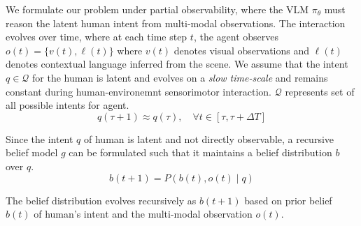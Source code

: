 \documentclass[letterpaper, 10 pt, conference]{ieeeconf}  %
\begin{document}
We formulate our problem under partial observability, where the   VLM $\pi_{\theta}$ must reason the latent human intent  from multi-modal observations. The interaction evolves over time, where at each time step $t$, the agent observes
$o(t) = \{v(t), \ell(t)\}$
where $v(t)$ denotes visual observations and $\ell(t)$ denotes contextual language inferred from the scene. 
We assume that the intent $q \in \mathcal{Q}$ for the human is latent and evolves on a \emph{slow time-scale} and remains constant during human-environemnt sensorimotor interaction. $\mathcal{Q}$ represents set of all possible intents for agent.
\begin{equation}
q(\tau + 1) \approx q(\tau), \quad \forall t \in [\tau, \tau + \Delta T]
\end{equation}
 
 Since the intent $q$ of human is latent and not directly observable, a recursive belief model $g$ can be formulated  such that it maintains a belief distribution $b$  over $q$.
\begin{equation}
b(t+1) = {P}(b(t), o(t) \mid q)
\end{equation}


The  belief distribution evolves recursively as $b(t + 1)$ based on  prior belief $b(t)$ of human's 
intent and the multi-modal observation $o(t)$.



\end{document}

